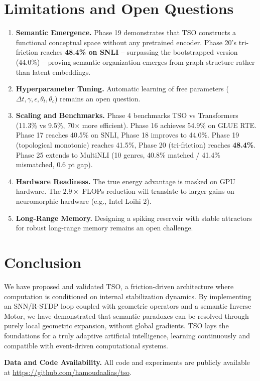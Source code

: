 \documentclass{article}
\begin{document}
\section{Limitations and Open Questions}

\begin{enumerate}
    \item \textbf{Semantic Emergence.} Phase 19 demonstrates that TSO constructs a functional conceptual space without any pretrained encoder. Phase 20's tri-friction reaches \textbf{48.4\% on SNLI} -- surpassing the bootstrapped version (44.0\%) -- proving semantic organization emerges from graph structure rather than latent embeddings.
    \item \textbf{Hyperparameter Tuning.} Automatic learning of free parameters ($\Delta t, \gamma, \epsilon, \theta_t, \theta_c$) remains an open question.
    \item \textbf{Scaling and Benchmarks.} Phase 4 benchmarks TSO vs Transformers (11.3\% vs 9.5\%, 70$\times$ more efficient). Phase 16 achieves 54.9\% on GLUE RTE. Phase 17 reaches 40.5\% on SNLI, Phase 18 improves to 44.0\%. Phase 19 (topological monotonic) reaches 41.5\%, Phase 20 (tri-friction) reaches \textbf{48.4\%}. Phase 25 extends to MultiNLI (10 genres, 40.8\% matched / 41.4\% mismatched, 0.6 pt gap).
    \item \textbf{Hardware Readiness.} The true energy advantage is masked on GPU hardware. The $2.9\times$ FLOPs reduction will translate to larger gains on neuromorphic hardware (e.g., Intel Loihi 2).
    \item \textbf{Long-Range Memory.} Designing a spiking reservoir with stable attractors for robust long-range memory remains an open challenge.
\end{enumerate}

\section{Conclusion}

We have proposed and validated TSO, a friction-driven architecture where computation is conditioned on internal stabilization dynamics. By implementing an SNN/R-STDP loop coupled with geometric operators and a semantic Inverse Motor, we have demonstrated that semantic paradoxes can be resolved through purely local geometric expansion, without global gradients. TSO lays the foundations for a truly adaptive artificial intelligence, learning continuously and compatible with event-driven computational systems.

\textbf{Data and Code Availability.} All code and experiments are publicly available at \url{https://github.com/hamoudaalias/tso}.
\end{document}
